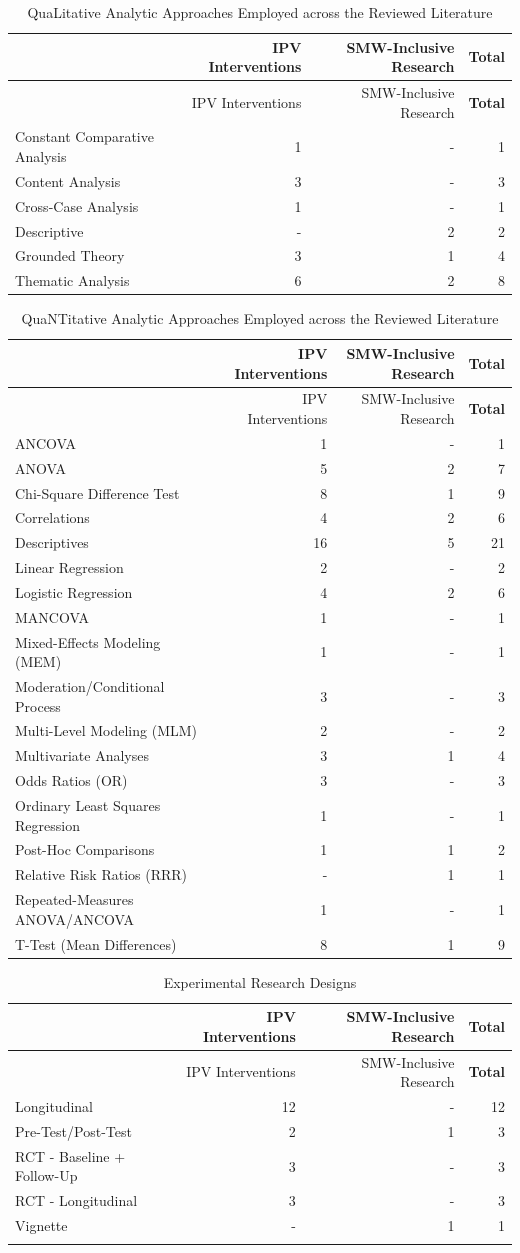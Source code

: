 \documentclass[11pt,]{tufte-book}
\begin{document}
\newpage

\begin{longtable}[]{@{}lrrr@{}}
\caption{QuaLitative Analytic Approaches Employed across the Reviewed
Literature \label{tbl:aql}}\tabularnewline
\toprule
& IPV Interventions & SMW-Inclusive Research &
\textbf{Total}\tabularnewline
\midrule
\endfirsthead
\toprule
& IPV Interventions & SMW-Inclusive Research &
\textbf{Total}\tabularnewline
\midrule
\endhead
Constant Comparative Analysis & 1 & - & 1\tabularnewline
Content Analysis & 3 & - & 3\tabularnewline
Cross-Case Analysis & 1 & - & 1\tabularnewline
Descriptive & - & 2 & 2\tabularnewline
Grounded Theory & 3 & 1 & 4\tabularnewline
Thematic Analysis & 6 & 2 & 8\tabularnewline
\bottomrule
\end{longtable}

\newpage

\begin{longtable}[]{@{}lrrr@{}}
\caption{QuaNTitative Analytic Approaches Employed across the Reviewed
Literature \label{tbl:aqt}}\tabularnewline
\toprule
& IPV Interventions & SMW-Inclusive Research &
\textbf{Total}\tabularnewline
\midrule
\endfirsthead
\toprule
& IPV Interventions & SMW-Inclusive Research &
\textbf{Total}\tabularnewline
\midrule
\endhead
ANCOVA & 1 & - & 1\tabularnewline
ANOVA & 5 & 2 & 7\tabularnewline
Chi-Square Difference Test & 8 & 1 & 9\tabularnewline
Correlations & 4 & 2 & 6\tabularnewline
Descriptives & 16 & 5 & 21\tabularnewline
Linear Regression & 2 & - & 2\tabularnewline
Logistic Regression & 4 & 2 & 6\tabularnewline
MANCOVA & 1 & - & 1\tabularnewline
Mixed-Effects Modeling (MEM) & 1 & - & 1\tabularnewline
Moderation/Conditional Process & 3 & - & 3\tabularnewline
Multi-Level Modeling (MLM) & 2 & - & 2\tabularnewline
Multivariate Analyses & 3 & 1 & 4\tabularnewline
Odds Ratios (OR) & 3 & - & 3\tabularnewline
Ordinary Least Squares Regression & 1 & - & 1\tabularnewline
Post-Hoc Comparisons & 1 & 1 & 2\tabularnewline
Relative Risk Ratios (RRR) & - & 1 & 1\tabularnewline
Repeated-Measures ANOVA/ANCOVA & 1 & - & 1\tabularnewline
T-Test (Mean Differences) & 8 & 1 & 9\tabularnewline
\bottomrule
\end{longtable}

\newpage

\begin{longtable}[]{@{}lrrr@{}}
\caption{Experimental Research Designs \label{tbl:expp}}\tabularnewline
\toprule
& IPV Interventions & SMW-Inclusive Research &
\textbf{Total}\tabularnewline
\midrule
\endfirsthead
\toprule
& IPV Interventions & SMW-Inclusive Research &
\textbf{Total}\tabularnewline
\midrule
\endhead
Longitudinal & 12 & - & 12\tabularnewline
Pre-Test/Post-Test & 2 & 1 & 3\tabularnewline
RCT - Baseline + Follow-Up & 3 & - & 3\tabularnewline
RCT - Longitudinal & 3 & - & 3\tabularnewline
Vignette & - & 1 & 1\tabularnewline
\newpage & & &\tabularnewline
\bottomrule
\end{longtable}
\end{document}
